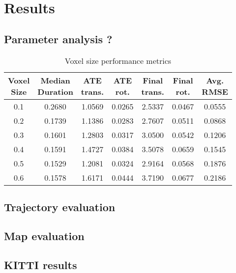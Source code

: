 \chapter{Results}
\label{ch:results}

\section{Parameter analysis ?}

\begin{table}[h]
    \centering
    \begin{tabular}{ccccccc}
        \hline
        \makecell{\textbf{Voxel}                                  \\ \textbf{Size}} &
        \makecell{\textbf{Median}                                 \\ \textbf{Duration}} &
        \makecell{\textbf{ATE}                                    \\ \textbf{trans.}} &
        \makecell{\textbf{ATE}                                    \\ \textbf{rot.}} &
        \makecell{\textbf{Final}                                  \\ \textbf{trans.}} &
        \makecell{\textbf{Final}                                  \\ \textbf{rot.}} &
        \makecell{\textbf{Avg.}                                   \\ \textbf{RMSE}} \\
        \hline
        \hline
        0.1 & 0.2680 & 1.0569 & 0.0265 & 2.5337 & 0.0467 & 0.0555 \\
        0.2 & 0.1739 & 1.1386 & 0.0283 & 2.7607 & 0.0511 & 0.0868 \\
        0.3 & 0.1601 & 1.2803 & 0.0317 & 3.0500 & 0.0542 & 0.1206 \\
        0.4 & 0.1591 & 1.4727 & 0.0384 & 3.5078 & 0.0659 & 0.1545 \\
        0.5 & 0.1529 & 1.2081 & 0.0324 & 2.9164 & 0.0568 & 0.1876 \\
        0.6 & 0.1578 & 1.6171 & 0.0444 & 3.7190 & 0.0677 & 0.2186 \\
        \hline
    \end{tabular}
    \caption{Voxel size performance metrics}
    \label{tab:voxel_metrics}
\end{table}


\section{Trajectory evaluation}

\section{Map evaluation}

\section{KITTI results}

